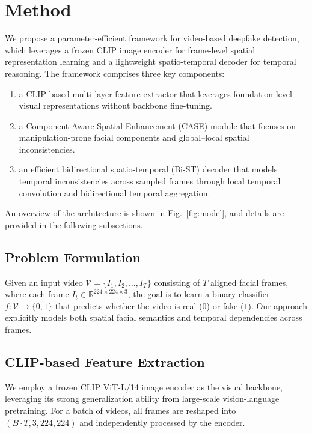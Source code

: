 \documentclass[runningheads]{llncs}
\begin{document}
\section{Method}
\label{sec:method}
We propose a parameter-efficient framework for video-based deepfake detection, which leverages a frozen CLIP image encoder for frame-level spatial representation learning and a lightweight spatio-temporal decoder for temporal reasoning. The framework comprises three key components:
\begin{enumerate}[
    label=(\arabic*),
  ]
    \item a CLIP-based multi-layer feature extractor that leverages foundation-level visual representations without backbone fine-tuning. 
    \item a Component-Aware Spatial Enhancement (CASE) module that focuses on manipulation-prone facial components and global–local spatial inconsistencies.
    \item an efficient bidirectional spatio-temporal (Bi-ST) decoder that models temporal inconsistencies across sampled frames through local temporal convolution and bidirectional temporal aggregation.
  \end{enumerate}
An overview of the architecture is shown in Fig.~\ref{fig:model}, and details are provided in the following subsections.

\subsection{Problem Formulation}

Given an input video $\mathcal{V} = \{I_1, I_2, \ldots, I_T\}$ consisting of $T$ aligned facial frames, where each frame $I_t \in \mathbb{R}^{224 \times 224 \times 3}$, the goal is to learn a binary classifier
$f: \mathcal{V} \rightarrow \{0,1\}$ that predicts whether the video is real ($0$) or fake ($1$). Our approach explicitly models both spatial facial semantics and temporal dependencies across frames.

\subsection{CLIP-based Feature Extraction}

We employ a frozen CLIP ViT-L/14 image encoder as the visual backbone, leveraging its strong generalization ability from large-scale vision-language pretraining. For a batch of videos, all frames are reshaped into $(B \cdot T, 3, 224, 224)$ and independently processed by the encoder.
\end{document}
